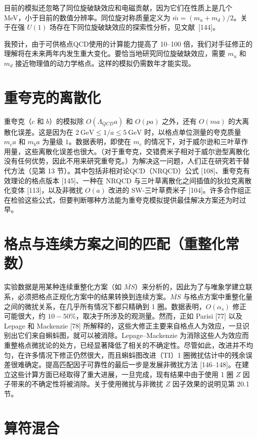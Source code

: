 目前的模拟还忽略了同位旋破缺效应和电磁贡献，因为它们在性质上是几个 MeV，小于目前的数值分辨率。同位旋对称质量定义为 $\bar{m} = (m_u + m_d)/2$。关于在强 $U(1)$ 场存在下同位旋破缺效应的探索性分析，见文献~[144]。

我预计，由于可供格点QCD使用的计算能力提高了 10--100 倍，我们对手征修正的理解将在未来两年内发生重大变化。要恰当地研究同位旋破缺效应，需要 $m_u$ 和 $m_d$ 接近物理值的动力学格点。这样的模拟仍需数年才能实现。

\section{重夸克的离散化}

重夸克（$c$ 和 $b$）的模拟除 $O(\Lambda_{QCD}a)$ 和 $O(pa)$ 之外，还有 $O(ma)$ 的大离散化误差。这是因为在 $2\ \mathrm{GeV} \le 1/a \le 5\ \mathrm{GeV}$ 时，以格点单位测量的夸克质量 $m_c a$ 和 $m_b a$ 为量级 $1$。数据表明，即使在 $m_c$ 的情况下，对于威尔逊和三叶草作用量，这些离散化误差也很大。（对于重夸克，交错费米子相对于威尔逊型离散化没有任何优势，因此不用来研究重夸克。）为解决这一问题，人们正在研究若干替代方法（见第 13 节）。其中包括非相对论QCD（NRQCD）公式 [108]、重夸克有效理论的格点版本 [145]、一种在 NRQCD 与三叶草离散化之间插值的狄拉克离散化变体 [113]，以及非微扰 $O(a)$ 改进的 SW-三叶草费米子 [104]。许多合作组正在检验这些公式，但要判断哪种方法能为重夸克模拟提供最佳解决方案还为时过早。

\section{格点与连续方案之间的匹配（重整化常数）}

实验数据是用某种连续重整化方案（如 $\overline{MS}$）来分析的，因此为了与唯象学建立联系，必须把格点正规化方案中的结果转换到连续方案。$\overline{MS}$ 与格点方案中重整化量之间的微扰关系，在几乎所有情况下都只精确到 1 圈。数据表明，$O(\alpha_s)$ 修正可能很大，约 $10 - 50\%$，取决于所涉及的观测量。然而，正如 Parisi [77] 以及 Lepage 和 Mackenzie [78] 所解释的，这些大修正主要来自格点人为效应，一旦识别出它们来自蝌蚪图，就可以被消除。Lepage--Mackenzie 为消除这些人为效应而重整格点微扰论的处方，已经显著降低了相关的不确定性。尽管如此，改进并不均匀，在许多情况下修正仍然很大，而且蝌蚪图改进（TI）1 圈微扰估计中的残余误差很难确定。提高匹配因子可靠性的最后一步是发展非微扰方法 [146--148]。在建立这些计算方面已经取得了重大进展，一旦完成，现有结果中由于使用 1 圈 $Z$ 因子带来的不确定性将被消除。关于使用微扰与非微扰 $Z$ 因子效果的说明见第 20.1 节。

\section{算符混合}

